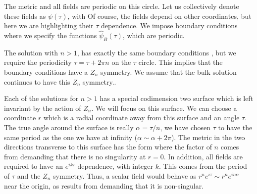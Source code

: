 The metric and all fields are periodic on this circle. Let us collectively denote
these fields as $\psi(\tau)$, with
\eqn\perfields{
\psi(\tau) \sim \psi(\tau + 2 \pi )
}
Of course, the fields depend on other coordinates, but
here we are highlighting their $\tau$ dependence.
We impose boundary conditions
\eqn{}
where we specify the functions $\hat \psi_B(\tau)$, which are periodic.

The solution with $n> 1$, has exactly the same boundary conditions \bcalf , but
we require the periodicity $\tau = \tau + 2 \pi n$ on the $\tau $ circle.
This implies that the boundary conditions have a $Z_n$ symmetry.
We assume that the bulk solution continues to have this $Z_n$ symmetry..


Each of the solutions for $n>1$ has a special codimension two
surface which is left invariant by the action of $Z_n$. We will
focus on this surface. We can choose a coordinate $r$ which is a radial coordinate away from this surface and
an angle $\tau$. The true angle around the surface is really $\alpha = \tau/n $, we have chosen $\tau$ to have
the same period as the one we have at infinity ($\alpha \sim \alpha + 2 \pi $). The metric in the two directions transverse to
this surface has the form
\eqn{}
where the factor of $n$ comes from demanding that there is no singularity at $r=0$.
 In addition,  all fields
are  required to have an $e^{ i k \tau }$ dependence, with integer $k$. This comes from the period of $\tau$  and
the $Z_n$ symmetry. Thus, a scalar field would behave as $r^n e^{ i \tau } \sim r^n e^{ i n \alpha } $ near the origin,
as results from demanding that it is non-singular.


